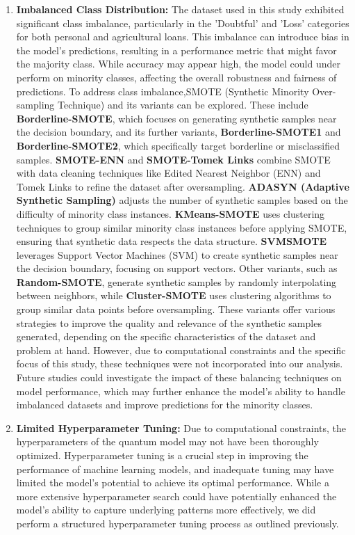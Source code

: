 \documentclass[a4paper]{article}
\begin{document}
\begin{enumerate}
	\item[] \textbf{Imbalanced Class Distribution:} The dataset used in this study exhibited significant class imbalance, particularly in the 'Doubtful' and 'Loss' categories for both personal and agricultural loans. This imbalance can introduce bias in the model’s predictions, resulting in a performance metric that might favor the majority class. While accuracy may appear high, the model could under perform on minority classes, affecting the overall robustness and fairness of predictions. To address class imbalance,SMOTE (Synthetic Minority Over-sampling Technique) and its variants can be explored. These include \textbf{Borderline-SMOTE}, which focuses on generating synthetic samples near the decision boundary, and its further variants, \textbf{Borderline-SMOTE1} and \textbf{Borderline-SMOTE2}, which specifically target borderline or misclassified samples. \textbf{SMOTE-ENN} and \textbf{SMOTE-Tomek Links} combine SMOTE with data cleaning techniques like Edited Nearest Neighbor (ENN) and Tomek Links to refine the dataset after oversampling. \textbf{ADASYN (Adaptive Synthetic Sampling)} adjusts the number of synthetic samples based on the difficulty of minority class instances. \textbf{KMeans-SMOTE} uses clustering techniques to group similar minority class instances before applying SMOTE, ensuring that synthetic data respects the data structure. \textbf{SVMSMOTE} leverages Support Vector Machines (SVM) to create synthetic samples near the decision boundary, focusing on support vectors. Other variants, such as \textbf{Random-SMOTE}, generate synthetic samples by randomly interpolating between neighbors, while \textbf{Cluster-SMOTE} uses clustering algorithms to group similar data points before oversampling. These variants offer various strategies to improve the quality and relevance of the synthetic samples generated, depending on the specific characteristics of the dataset and problem at hand. However, due to computational constraints and the specific focus of this study, these techniques were not incorporated into our analysis. Future studies could investigate the impact of these balancing techniques on model performance, which may further enhance the model’s ability to handle imbalanced datasets and improve predictions for the minority classes.
	
	\item[] \textbf{Limited Hyperparameter Tuning:} Due to computational constraints, the hyperparameters of the quantum model may not have been thoroughly optimized. Hyperparameter tuning is a crucial step in improving the performance of machine learning models, and inadequate tuning may have limited the model’s potential to achieve its optimal performance. While a more extensive hyperparameter search could have potentially enhanced the model’s ability to capture underlying patterns more effectively, we did perform a structured hyperparameter tuning process as outlined previously.
	

\end{enumerate}
\end{document}
